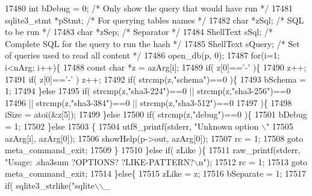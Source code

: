 \begin{DoxyCode}
{{{{{{{{{{{{{{{{{{{{{{{{{{{{{{{{{{{{{{{{{{{{{{{{{{{{{{{{{{{{{{{{{{{{{{{{{{{{{{{{{{{{{{{{{{{{{{{{{{{{{{{{{{{{{{{17480     \textcolor{keywordtype}{int} bDebug = 0;          \textcolor{comment}{/* Only show the query that would have run */}
17481     sqlite3_stmt *pStmt;     \textcolor{comment}{/* For querying tables names */}
17482     \textcolor{keywordtype}{char} *zSql;              \textcolor{comment}{/* SQL to be run */}
17483     \textcolor{keywordtype}{char} *zSep;              \textcolor{comment}{/* Separator */}
17484     ShellText sSql;          \textcolor{comment}{/* Complete SQL for the query to run the hash */}
17485     ShellText sQuery;        \textcolor{comment}{/* Set of queries used to read all content */}
17486     open_db(p, 0);
17487     \textcolor{keywordflow}{for}(i=1; i<nArg; i++)\{
17488       \textcolor{keyword}{const} \textcolor{keywordtype}{char} *z = azArg[i];
17489       \textcolor{keywordflow}{if}( z[0]==\textcolor{charliteral}{'-'} )\{
17490         z++;
17491         \textcolor{keywordflow}{if}( z[0]==\textcolor{charliteral}{'-'} ) z++;
17492         \textcolor{keywordflow}{if}( strcmp(z,\textcolor{stringliteral}{"schema"})==0 )\{
17493           bSchema = 1;
17494         \}\textcolor{keywordflow}{else}
17495         \textcolor{keywordflow}{if}( strcmp(z,\textcolor{stringliteral}{"sha3-224"})==0 || strcmp(z,\textcolor{stringliteral}{"sha3-256"})==0
17496          || strcmp(z,\textcolor{stringliteral}{"sha3-384"})==0 || strcmp(z,\textcolor{stringliteral}{"sha3-512"})==0
17497         )\{
17498           iSize = atoi(&z[5]);
17499         \}\textcolor{keywordflow}{else}
17500         \textcolor{keywordflow}{if}( strcmp(z,\textcolor{stringliteral}{"debug"})==0 )\{
17501           bDebug = 1;
17502         \}\textcolor{keywordflow}{else}
17503         \{
17504           utf8_printf(stderr, \textcolor{stringliteral}{"Unknown option \(\backslash\)"%
17505                       azArg[i], azArg[0]);
17506           showHelp(p->out, azArg[0]);
17507           rc = 1;
17508           \textcolor{keywordflow}{goto} meta\_command\_exit;
17509         \}
17510       \}\textcolor{keywordflow}{else} \textcolor{keywordflow}{if}( zLike )\{
17511         raw_printf(stderr, \textcolor{stringliteral}{"Usage: .sha3sum ?OPTIONS? ?LIKE-PATTERN?\(\backslash\)n"});
17512         rc = 1;
17513         \textcolor{keywordflow}{goto} meta\_command\_exit;
17514       \}\textcolor{keywordflow}{else}\{
17515         zLike = z;
17516         bSeparate = 1;
17517         \textcolor{keywordflow}{if}( sqlite3_strlike(\textcolor{stringliteral}{"sqlite\(\backslash\)\(\backslash\)\_%
}}}}}}}}}}}}}}}}}}}}}}}}}}}}}}}}}}}}}}}}}}}}}}}}}}}}}}}}}}}}}}}}}}}}}}}}}}}}}}}}}}}}}}}}}}}}}}}}}}}}}}}}}}}}}}}}}
\end{DoxyCode}
